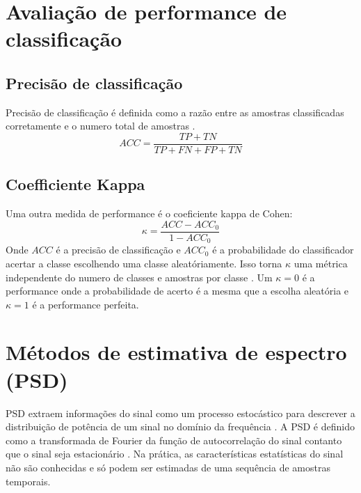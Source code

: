 \section{Avalia\c{c}\~ao de performance de classifica\c{c}\~ao}
\subsection{Precis\~ao de classifica\c{c}\~ao}
\par
Precis\~ao de classifica\c{c}\~ao \'e definida como a raz\~ao entre as amostras classificadas corretamente e o numero total de amostras \cite{RAO}.
\begin{equation}\label{eq:ACC}
ACC=\frac{TP+TN}{TP+FN+FP+TN}
\end{equation}
\subsection{Coefficiente Kappa}
Uma outra medida de performance \'e o coeficiente kappa de Cohen:
\begin{equation}\label{eq:kappa}
\kappa=\frac{ACC-ACC_0}{1-ACC_0}
\end{equation}
Onde $ACC$ \'e a precis\~ao de classifica\c{c}\~ao e $ACC_0$ \'e a probabilidade do classificador acertar a classe escolhendo uma classe aleat\'oriamente. Isso torna $\kappa$ uma m\'etrica independente do numero de classes e amostras por classe \cite{RAO}. Um $\kappa = 0$ \'e a performance onde a probabilidade de acerto \'e a mesma que a escolha aleat\'oria e $\kappa = 1$ \'e a performance perfeita.

\clearpage
\section{M\'etodos de estimativa de espectro (PSD)}
\par 
\ac{PSD} extraem informa\c{c}\~oes do sinal como um processo estoc\'astico para descrever a distribui\c{c}\~ao de pot\^encia de um sinal no dom\'inio da frequ\^encia \cite{Comparison2008}.
A \ac{PSD} \'e definido como a transformada de Fourier da fun\c{c}\~ao de autocorrela\c{c}\~ao do sinal contanto que o sinal seja estacion\'ario \cite{Comparison2008}.
Na pr\'atica, as caracter\'isticas estat\'isticas do sinal n\~ao s\~ao conhecidas e s\'o podem ser estimadas de uma sequ\^encia de amostras temporais.
